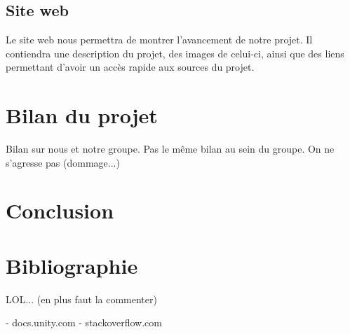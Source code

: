﻿\documentclass[12pt]{article}
\begin{document}
\subsection{Site web}
Le site web nous permettra de montrer l’avancement de notre projet.
Il contiendra une description du projet, des images de celui-ci, ainsi que des
liens permettant d’avoir un accès rapide aux sources du projet.



\section{Bilan du projet}
Bilan sur nous et notre groupe.
Pas le même bilan au sein du groupe.
On ne s'agresse pas (dommage...)

\section{Conclusion}

\section{Bibliographie}
LOL... (en plus faut la commenter)

- docs.unity.com
- stackoverflow.com
\end{document}
